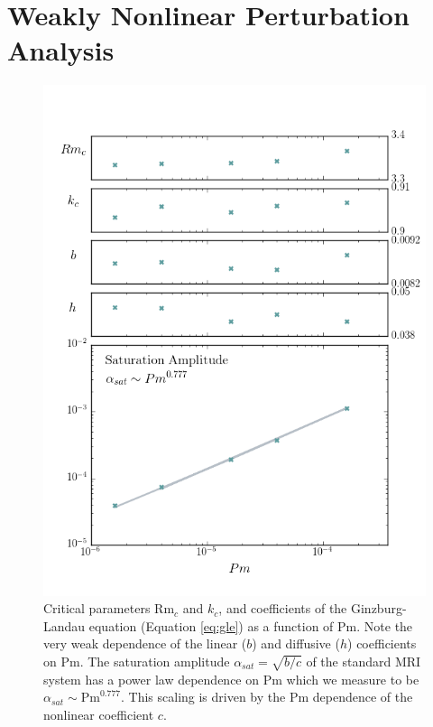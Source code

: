 \documentclass{emulateapj}
\newcommand\reym{\mathrm{Rm}}
\newcommand{\Pm}{\mathrm{Pm}}
\begin{document}
\section{Weakly Nonlinear Perturbation Analysis}\label{sec:wnl_analysis}
\label{sec:Perturbation}
\begin{figure}
\centering
\includegraphics[width=\columnwidth]{../figures/widegap_coeffs_satampscaling_fivepoints.png}
\caption{Critical parameters $\reym_c$ and $k_c$, and coefficients of the Ginzburg-Landau equation (Equation \ref{eq:gle}) as a function of $\Pm$. Note the very weak dependence of the linear ($b$) and diffusive ($h$) coefficients on $\Pm$. The saturation amplitude $\alpha_{sat} = \sqrt{b/c}$ of the standard MRI system has a power law dependence on $\Pm$ which we measure to be $\alpha_{sat} \sim \Pm^{0.777}$. This scaling is driven by the $\Pm$ dependence of the nonlinear coefficient $c$.}\label{fig:coefficients}
\end{figure}
\end{document}
